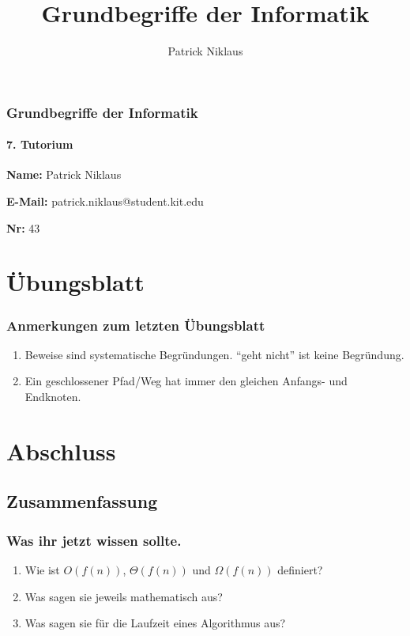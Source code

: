 \documentclass{beamer}
\title{Grundbegriffe der Informatik}
\author{Patrick Niklaus}
\begin{document}
\begin{frame}
  \frametitle{Grundbegriffe der Informatik}
  \framesubtitle{7. Tutorium}
  \begin{description}
    \item \textbf{Name:} Patrick Niklaus
    \item \textbf{E-Mail:} patrick.niklaus@student.kit.edu
    \item \textbf{Nr:} 43
  \end{description}
\end{frame}

\section{Übungsblatt}
\begin{frame}
  \frametitle{Anmerkungen zum letzten Übungsblatt}
  \begin{enumerate}
    \item Beweise sind systematische Begründungen. "`geht nicht"' ist keine Begründung.
    \item Ein geschlossener Pfad/Weg hat immer den gleichen Anfangs- und Endknoten.
  \end{enumerate}
\end{frame}



\section{Abschluss}
\subsection{Zusammenfassung}
\begin{frame}
  \frametitle{Was ihr jetzt wissen sollte.}
  \begin{enumerate}
    \item Wie ist $O(f(n))$, $\Theta(f(n))$ und $\Omega(f(n))$ definiert?
    \item Was sagen sie jeweils mathematisch aus?
    \item Was sagen sie für die Laufzeit eines Algorithmus aus?
  \end{enumerate}
\end{frame}
\end{document}
